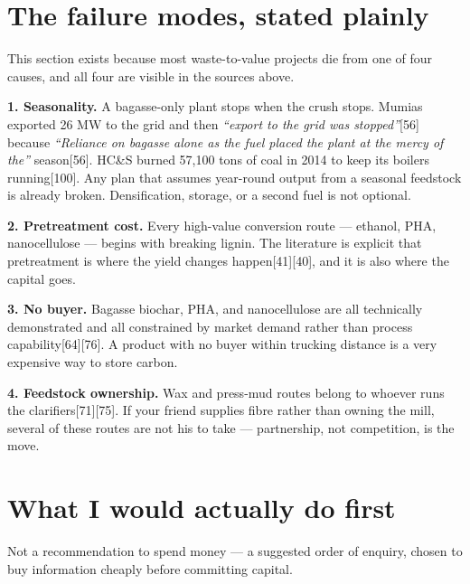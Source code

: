 \documentclass[11pt]{article}
\newcommand{\src}[1]{[#1]}
\begin{document}
\section{The failure modes, stated plainly}

This section exists because most waste-to-value projects die from one of four
causes, and all four are visible in the sources above.

\textbf{1. Seasonality.} A bagasse-only plant stops when the crush stops.
Mumias exported 26 MW to the grid and then \emph{``export to the grid was
stopped''}\src{56} because \emph{``Reliance on bagasse alone as the fuel placed
the plant at the mercy of the''} season\src{56}. HC\&S burned 57{,}100 tons of
coal in 2014 to keep its boilers running\src{100}. Any plan that assumes
year-round output from a seasonal feedstock is already broken. Densification,
storage, or a second fuel is not optional.

\textbf{2. Pretreatment cost.} Every high-value conversion route --- ethanol,
PHA, nanocellulose --- begins with breaking lignin. The literature is explicit
that pretreatment is where the yield changes happen\src{41}\src{40}, and it is
also where the capital goes.

\textbf{3. No buyer.} Bagasse biochar, PHA, and nanocellulose are all
technically demonstrated and all constrained by market demand rather than
process capability\src{64}\src{76}. A product with no buyer within trucking
distance is a very expensive way to store carbon.

\textbf{4. Feedstock ownership.} Wax and press-mud routes belong to whoever
runs the clarifiers\src{71}\src{75}. If your friend supplies fibre rather than
owning the mill, several of these routes are not his to take --- partnership,
not competition, is the move.

\section{What I would actually do first}

Not a recommendation to spend money --- a suggested order of enquiry, chosen to
buy information cheaply before committing capital.
\end{document}
